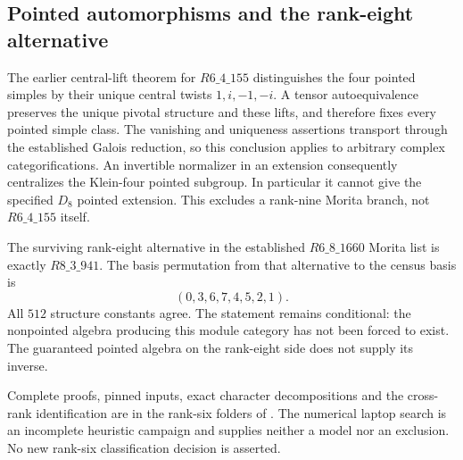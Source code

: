 \subsection{Pointed automorphisms and the rank-eight alternative}
The earlier central-lift theorem for $R6\_4\_155$ distinguishes the four
pointed simples by their unique central twists $1,i,-1,-i$.
A tensor autoequivalence preserves the unique pivotal structure and
these lifts, and therefore fixes every pointed simple class. The
vanishing and uniqueness assertions transport through the established
Galois reduction, so this conclusion applies to arbitrary complex
categorifications. An invertible normalizer in an extension consequently
centralizes the Klein-four pointed subgroup. In particular it cannot
give the specified $D_8$ pointed extension. This excludes a rank-nine
Morita branch, not $R6\_4\_155$ itself.

The surviving rank-eight alternative in the established
$R6\_8\_1660$ Morita list is exactly $R8\_3\_941$. The basis permutation
from that alternative to the census basis is
\[
 (0,3,6,7,4,5,2,1).
\]
All $512$ structure constants agree. The statement remains conditional:
the nonpointed algebra producing this module category has not been
forced to exist. The guaranteed pointed algebra on the rank-eight side
does not supply its inverse.

Complete proofs, pinned inputs, exact character decompositions and the
cross-rank identification are in the rank-six folders of
. The numerical laptop search
is an incomplete heuristic campaign and supplies neither a model nor
an exclusion. No new rank-six classification decision is asserted.
